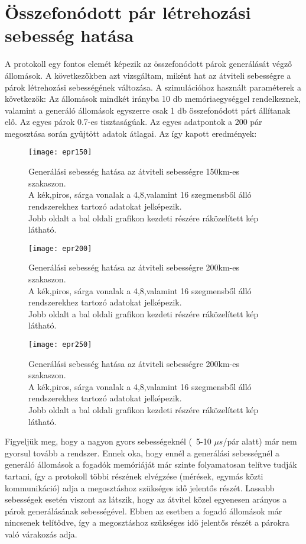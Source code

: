 \section{Összefonódott pár létrehozási sebesség hatása}

A protokoll egy fontos elemét képezik az összefonódott párok generálását végző állomások. A következőkben azt vizsgáltam, miként hat az átviteli sebességre a párok létrehozási sebességének változása. A szimulációhoz használt paraméterek a következők: Az állomások mindkét irányba 10 db memóriaegységgel rendelkeznek, valamint a generáló állomások egyszerre csak 1 db összefonódott párt állítanak elő. Az egyes párok 0.7-es tisztaságúak. Az egyes adatpontok a 200 pár megosztása során gyűjtött adatok átlagai. Az így kapott eredmények:
\begin{figure}[H]
\centering
\texttt{[image: epr150]}
\caption[Generálási sebesség hatása(150km)]{Generálási sebesség hatása az átviteli sebességre 150km-es szakaszon.\\
A kék,piros, sárga vonalak a 4,8,valamint 16 szegmensből álló rendszerekhez tartozó adatokat jelképezik.\\
Jobb oldalt a bal oldali grafikon kezdeti részére ráközelített kép látható.
}
\end{figure}
\begin{figure}[H]
\centering
\texttt{[image: epr200]}
\caption[Generálási sebesség hatása(200km)]{Generálási sebesség hatása az átviteli sebességre 200km-es szakaszon.\\
A kék,piros, sárga vonalak a 4,8,valamint 16 szegmensből álló rendszerekhez tartozó adatokat jelképezik.\\
Jobb oldalt a bal oldali grafikon kezdeti részére ráközelített kép látható.
}
\end{figure}
\begin{figure}[H]
\centering
\texttt{[image: epr250]}
\caption[Generálási sebesség hatása(200km)]{Generálási sebesség hatása az átviteli sebességre 200km-es szakaszon.\\
A kék,piros, sárga vonalak a 4,8,valamint 16 szegmensből álló rendszerekhez tartozó adatokat jelképezik.\\
Jobb oldalt a bal oldali grafikon kezdeti részére ráközelített kép látható.
}
\end{figure}
Figyeljük meg, hogy a nagyon gyors sebességeknél (~5-10 $\mu s$/pár alatt) már nem gyorsul tovább a rendszer. Ennek oka, hogy ennél a generálási sebességnél a generáló állomások a fogadók memóriáját már szinte folyamatosan telítve tudják tartani, így a protokoll többi részének elvégzése (mérések, egymás közti kommunikáció) adja a megosztáshoz szükséges idő jelentős részét. Lassabb sebességek esetén viszont az látszik, hogy az átvitel közel egyenesen arányos a párok generálásának sebességével. Ebben az esetben a fogadó állomások már nincsenek telítődve, így a megosztáshoz szükséges idő jelentős részét a párokra való várakozás adja.


